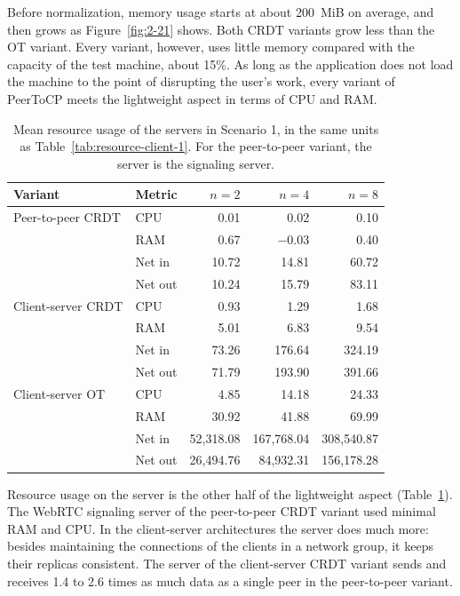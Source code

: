 Before normalization, memory usage starts at about 200~MiB on average, and then grows as Figure~\ref{fig:2-21} shows. Both CRDT variants grow less than the OT variant. Every variant, however, uses little memory compared with the capacity of the test machine, about 15\%. As long as the application does not load the machine to the point of disrupting the user's work, every variant of PeerToCP meets the lightweight aspect in terms of CPU and RAM.

\begin{table}[htbp]
 \centering
 \caption[Mean resource usage of the servers in Scenario 1]{Mean resource usage of the servers in Scenario 1, in the same units as Table~\ref{tab:resource-client-1}. For the peer-to-peer variant, the server is the signaling server.}
 \label{tab:resource-server-1}
 \begin{tabular}{@{}llrrr@{}}
 \toprule
 \textbf{Variant} & \textbf{Metric} & $n = 2$ & $n = 4$ & $n = 8$ \\
 \midrule
 Peer-to-peer CRDT & CPU     & 0.01     & 0.02     & 0.10 \\
                   & RAM     & 0.67     & $-$0.03  & 0.40 \\
                   & Net in  & 10.72    & 14.81    & 60.72 \\
                   & Net out & 10.24 & 15.79 & 83.11 \\
 \midrule
 Client-server CRDT & CPU     & 0.93     & 1.29      & 1.68 \\
                    & RAM     & 5.01     & 6.83      & 9.54 \\
                    & Net in  & 73.26    & 176.64    & 324.19 \\
                    & Net out & 71.79 & 193.90 & 391.66 \\
 \midrule
 Client-server OT & CPU     & 4.85        & 14.18       & 24.33 \\
                  & RAM     & 30.92       & 41.88       & 69.99 \\
                  & Net in  & 52{,}318.08    & 167{,}768.04   & 308{,}540.87 \\
                  & Net out & 26{,}494.76 & 84{,}932.31 & 156{,}178.28 \\
 \bottomrule
 \end{tabular}
\end{table}

Resource usage on the server is the other half of the lightweight aspect (Table~\ref{tab:resource-server-1}). The WebRTC signaling server of the peer-to-peer CRDT variant used minimal RAM and CPU. In the client-server architectures the server does much more: besides maintaining the connections of the clients in a network group, it keeps their replicas consistent. The server of the client-server CRDT variant sends and receives 1.4 to 2.6 times as much data as a single peer in the peer-to-peer variant.

